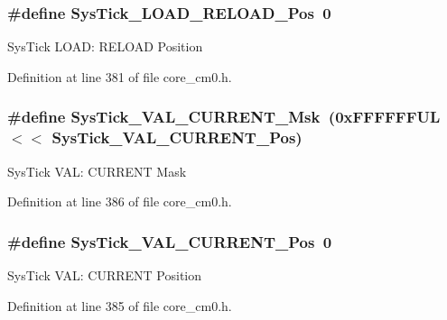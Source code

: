 \subsubsection[{\texorpdfstring{Sys\+Tick\+\_\+\+L\+O\+A\+D\+\_\+\+R\+E\+L\+O\+A\+D\+\_\+\+Pos}{SysTick_LOAD_RELOAD_Pos}}]{\setlength{\rightskip}{0pt plus 5cm}\#define Sys\+Tick\+\_\+\+L\+O\+A\+D\+\_\+\+R\+E\+L\+O\+A\+D\+\_\+\+Pos~0}\hypertarget{group___c_m_s_i_s___sys_tick_gaf44d10df359dc5bf5752b0894ae3bad2}{}\label{group___c_m_s_i_s___sys_tick_gaf44d10df359dc5bf5752b0894ae3bad2}
Sys\+Tick L\+O\+AD\+: R\+E\+L\+O\+AD Position 

Definition at line 381 of file core\+\_\+cm0.\+h.

\subsubsection[{\texorpdfstring{Sys\+Tick\+\_\+\+V\+A\+L\+\_\+\+C\+U\+R\+R\+E\+N\+T\+\_\+\+Msk}{SysTick_VAL_CURRENT_Msk}}]{\setlength{\rightskip}{0pt plus 5cm}\#define Sys\+Tick\+\_\+\+V\+A\+L\+\_\+\+C\+U\+R\+R\+E\+N\+T\+\_\+\+Msk~(0x\+F\+F\+F\+F\+F\+F\+U\+L $<$$<$ Sys\+Tick\+\_\+\+V\+A\+L\+\_\+\+C\+U\+R\+R\+E\+N\+T\+\_\+\+Pos)}\hypertarget{group___c_m_s_i_s___sys_tick_gafc77b56d568930b49a2474debc75ab45}{}\label{group___c_m_s_i_s___sys_tick_gafc77b56d568930b49a2474debc75ab45}
Sys\+Tick V\+AL\+: C\+U\+R\+R\+E\+NT Mask 

Definition at line 386 of file core\+\_\+cm0.\+h.

\subsubsection[{\texorpdfstring{Sys\+Tick\+\_\+\+V\+A\+L\+\_\+\+C\+U\+R\+R\+E\+N\+T\+\_\+\+Pos}{SysTick_VAL_CURRENT_Pos}}]{\setlength{\rightskip}{0pt plus 5cm}\#define Sys\+Tick\+\_\+\+V\+A\+L\+\_\+\+C\+U\+R\+R\+E\+N\+T\+\_\+\+Pos~0}\hypertarget{group___c_m_s_i_s___sys_tick_ga3208104c3b019b5de35ae8c21d5c34dd}{}\label{group___c_m_s_i_s___sys_tick_ga3208104c3b019b5de35ae8c21d5c34dd}
Sys\+Tick V\+AL\+: C\+U\+R\+R\+E\+NT Position 

Definition at line 385 of file core\+\_\+cm0.\+h.

